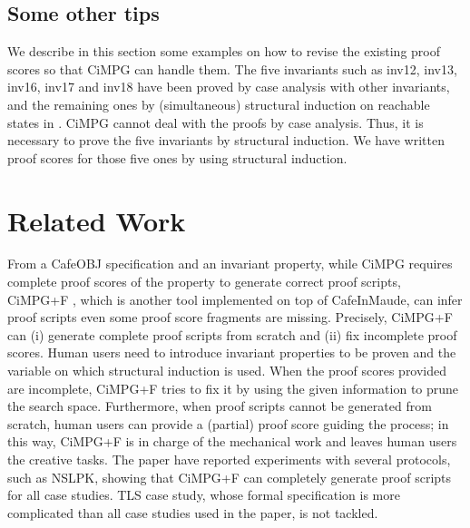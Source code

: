 \documentclass[a4paper,fleqn]{cas-dc}
\begin{document}
\subsection{Some other tips}

We describe in this section some examples on how to revise the existing proof scores so that CiMPG can handle them. The five invariants such as inv12, inv13, inv16, inv17 and inv18 have been proved by case analysis with other invariants, and the remaining ones by (simultaneous) structural induction on reachable states in \cite{ogata05}. CiMPG cannot deal with the proofs by case analysis. Thus, it is necessary to prove the five invariants by structural induction. We have written proof scores for those five ones by using structural induction.

\section{Related Work}\label{relatedwork}
From a CafeOBJ specification and an invariant property,
while CiMPG requires complete proof scores of the property to generate correct proof scripts,
CiMPG+F \cite{Riesco20}, which is another tool implemented on top of CafeInMaude,
can infer proof scripts even some proof score fragments are missing.
Precisely, CiMPG+F can (i) generate complete proof scripts from scratch and (ii) fix incomplete proof scores.
Human users need to introduce invariant properties to be proven and the variable on which structural induction is used.
When the proof scores provided are incomplete, CiMPG+F tries to fix it by using the given information to prune the search space.
Furthermore, when proof scripts cannot be generated from scratch, human users can provide a (partial) proof score guiding the process; in this way, CiMPG+F is in charge of the mechanical work and leaves human users the creative tasks.
The paper \cite{Riesco20} have reported experiments with several protocols, such as NSLPK, showing that CiMPG+F can completely generate proof scripts for all case studies.
TLS case study, whose formal specification is more complicated than all case studies used in the paper, is not tackled.

\end{document}
